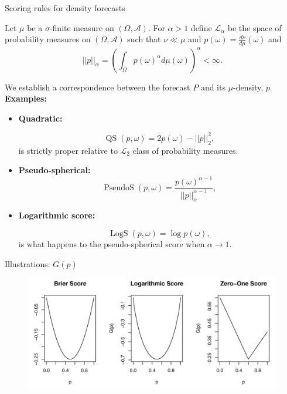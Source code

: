 \begin{frame}{Scoring rules for density forecasts}

Let $\mu$ be a $\sigma$-finite measure on $(\Omega, \mathcal{A})$. 
For $\alpha > 1$ define $\mathcal{L}_\alpha$ be the space of probability measures on $(\Omega, \mathcal{A})$ such that $\nu \ll \mu$ and $p(\omega) = \frac{d \nu}{d \mu}(\omega)$ and 
\begin{equation}
\nonumber
 ||p||_\alpha = \left( \int_{\Omega} p(\omega)^\alpha d\mu(\omega) \right)^\alpha < \infty.
\end{equation}

We establish a correspondence between the forecast $P$ and its $\mu$-density, $p$.
\textbf{Examples:}
\begin{itemize}
 \item \textbf{Quadratic:}
 
 \begin{equation}
  \operatorname{QS}(p, \omega) = 2p(\omega) - ||p||_2^2,
 \end{equation}
is strictly proper relative to $\mathcal{L}_2$ class of probability measures. 

\item \textbf{Pseudo-spherical:}
 \begin{equation}
  \operatorname{PseudoS}(p, \omega) = \frac{p(\omega)^{\alpha-1}}{||p||_{\alpha}^{\alpha-1}},
 \end{equation}
\item \textbf{Logarithmic score:}

 \begin{equation}
  \operatorname{LogS}(p, \omega) = \log p(\omega),
 \end{equation}
 is what happens to the pseudo-spherical score when $\alpha \to 1$.
\end{itemize}
\end{frame}
\begin{frame}{Illustrations: $G(p)$}
\begin{figure}
 \begin{center}
  \includegraphics[scale=0.45]{figures/G_of_p.pdf}
 \end{center}
\end{figure}
\end{frame}
